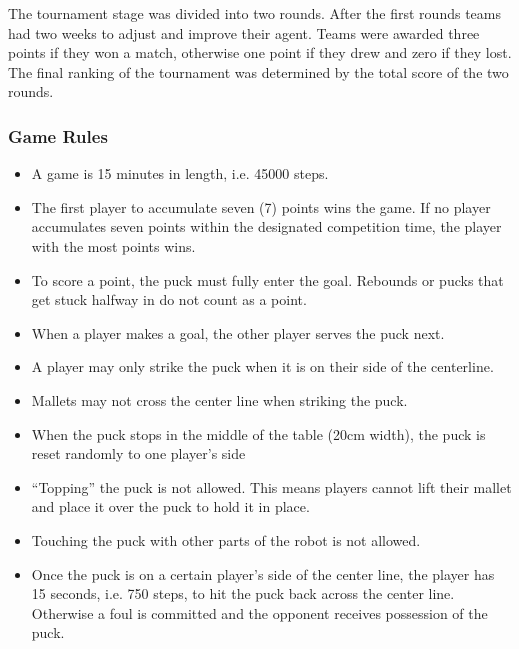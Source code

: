The tournament stage was divided into two rounds. After the first rounds teams had two weeks to adjust and improve their agent.
Teams were awarded three points if they won a match, otherwise one point if they drew and zero if they lost.
The final ranking of the tournament was determined by the total score of the two rounds.

\subsubsection{Game Rules}
\begin{itemize}
    \item A game is 15 minutes in length, i.e. 45000 steps.
    \item The first player to accumulate seven (7) points wins the game. If no player accumulates seven points within the designated competition time, the player with the most points wins.
    \item To score a point, the puck must fully enter the goal. Rebounds or pucks that get stuck halfway in do not count as a point.
    \item When a player makes a goal, the other player serves the puck next.
    \item A player may only strike the puck when it is on their side of the centerline.
    \item Mallets may not cross the center line when striking the puck.
    \item When the puck stops in the middle of the table (20cm width), the puck is reset randomly to one player's side
    \item “Topping” the puck is not allowed. This means players cannot lift their mallet and place it over the puck to hold it in place.
    \item Touching the puck with other parts of the robot is not allowed.
    \item Once the puck is on a certain player's side of the center line, the player has 15 seconds, i.e. 750 steps, to hit the puck back across the center line. Otherwise a foul is committed and the opponent receives possession of the puck.
\end{itemize}

